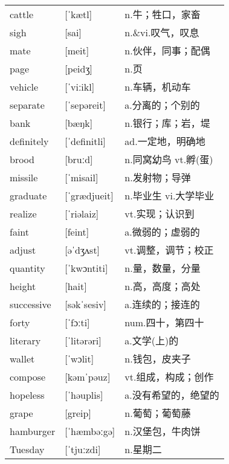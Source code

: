 \documentclass[a4paper]{article}
\begin{document}
\section{}
\begin{tabular}{l l l}

cattle & [ˈkætl] & n.牛；牲口，家畜 \\
sigh & [sai] & n.\&vi.叹气，叹息 \\
mate & [meit] & n.伙伴，同事；配偶 \\
page & [peidʒ] & n.页 \\
vehicle & [ˈviːikl] & n.车辆，机动车 \\
separate & [ˈsepəreit] & a.分离的；个别的 \\
bank & [bæŋk] & n.银行；库；岩，堤 \\
definitely & [ˈdefinitli] & ad.一定地，明确地 \\
brood & [bruːd] & n.同窝幼鸟 vt.孵(蛋) \\
missile & [ˈmisail] & n.发射物；导弹 \\
graduate & [ˈgrædjueit] & n.毕业生 vi.大学毕业 \\
realize & [ˈriəlaiz] & vt.实现；认识到 \\
faint & [feint] & a.微弱的；虚弱的 \\
adjust & [əˈdʒʌst] & vt.调整，调节；校正 \\
quantity & [ˈkwɔntiti] & n.量，数量，分量 \\
height & [hait] & n.高，高度；高处 \\
successive & [səkˈsesiv] & a.连续的；接连的 \\
forty & [ˈfɔːti] & num.四十，第四十 \\
literary & [ˈlitərəri] & a.文学(上)的 \\
wallet & [ˈwɔlit] & n.钱包，皮夹子 \\
compose & [kəmˈpəuz] & vt.组成，构成；创作 \\
hopeless & [ˈhəuplis] & a.没有希望的，绝望的 \\
grape & [greip] & n.葡萄；葡萄藤 \\
hamburger & [ˈhæmbəːgə] & n.汉堡包，牛肉饼 \\
Tuesday & [ˈtjuːzdi] & n.星期二 \\

\end{tabular}
\end{document}
